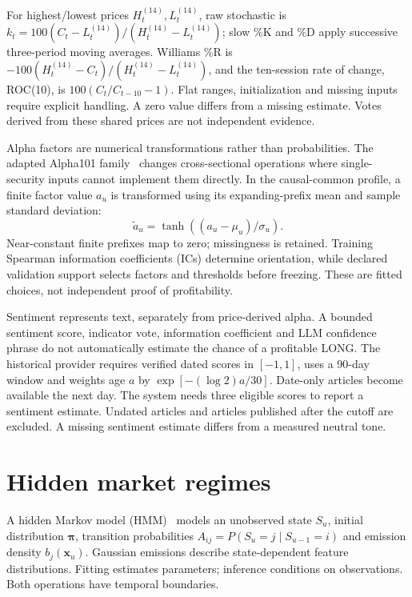 For highest/lowest prices $H_t^{(14)},L_t^{(14)}$, raw stochastic is
$k_t=100(C_t-L_t^{(14)})/(H_t^{(14)}-L_t^{(14)})$; slow \%K and \%D apply
successive three-period moving averages. Williams \%R is
$-100(H_t^{(14)}-C_t)/(H_t^{(14)}-L_t^{(14)})$, and the ten-session rate of change, ROC(10), is
$100(C_t/C_{t-10}-1)$. Flat ranges, initialization and missing inputs
require explicit handling. A zero value differs from a missing estimate.
Votes derived from these shared prices are not independent evidence.

Alpha factors are numerical transformations rather than probabilities.
The adapted Alpha101 family~\cite{kakushadze2016formulaic} changes cross-sectional operations where
single-security inputs cannot implement them directly.
In the causal-common profile, a finite
factor value $a_u$ is transformed using its expanding-prefix mean and
sample standard deviation:
\begin{equation}
\widetilde a_u=\tanh((a_u-\mu_u)/\sigma_u).
\end{equation}
Near-constant finite prefixes map to zero; missingness is retained.
Training Spearman information coefficients (ICs) determine orientation, while
declared validation support selects factors and thresholds before
freezing. These are fitted choices, not independent proof of profitability.

Sentiment represents text, separately from price-derived alpha. A bounded
sentiment score, indicator vote, information coefficient and LLM confidence
phrase do not automatically estimate the chance of a profitable LONG.
The historical provider requires verified dated scores in $[-1,1]$,
uses a 90-day window and weights age $a$ by $\exp[-(\log2)a/30]$. Date-only
articles become available the next day. The system needs three eligible scores to report a sentiment estimate.
Undated articles and articles published after the cutoff are excluded.
A missing sentiment estimate differs from a measured neutral tone.

\section{Hidden market regimes}\label{s:5afcb21224a45c1c}
A hidden Markov model (HMM)~\cite{rabiner1989hmm} models an unobserved state $S_u$, initial distribution
$\boldsymbol\pi$, transition probabilities $A_{ij}=P(S_u=j\mid S_{u-1}=i)$
and emission density $b_j(\boldsymbol x_u)$. Gaussian emissions describe
state-dependent feature distributions. Fitting estimates parameters;
inference conditions on observations. Both operations have temporal
boundaries.


